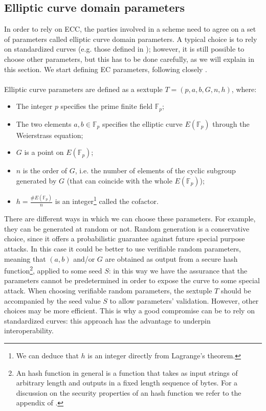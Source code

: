 \subsection{Elliptic curve domain parameters}
\label{ecparam}
In order to rely on ECC, the parties involved in a scheme need to agree on a set of parameters called elliptic curve domain parameters. A typical choice is to rely on standardized curves (e.g. those defined in \cite{RefWork:3}); however, it is still possible to choose other parameters, but this has to be done carefully, as we will explain in this section. We start defining EC parameters, following closely \cite{RefWork:2}.
\\
\\
Elliptic curve parameters are defined as a sextuple $T = (p, a, b, G, n, h)$, where:
\begin{itemize}
	\item The integer $p$ specifies the prime finite field $\mathbb{F}_p$;
	\item The two elements $a, b \in \mathbb{F}_p$ specifies the elliptic curve $E(\mathbb{F}_p)$ through the Weierstrass equation;
	\item $G$ is a point on $E(\mathbb{F}_p)$;
	\item $n$ is the order of $G$, i.e. the number of elements of the cyclic subgroup generated by $G$ (that can coincide with the whole $E(\mathbb{F}_p)$);
	\item $h = \frac{\#E(\mathbb{F}_p)}{n}$ is an integer\footnote{We can deduce that $h$ is an integer directly from Lagrange's theorem.} called the cofactor. 
\end{itemize}
There are different ways in which we can choose these parameters. For example, they can be generated at random or not. Random generation is a conservative choice, since it offers a probabilistic guarantee against future special purpose attacks. In this case it could be better to use verifiable random parameters, meaning that $(a, b)$ and/or $G$ are obtained as output from a secure hash function\footnote{An hash function in general is a function that takes as input strings of arbitrary length and outputs in a fixed length sequence of bytes. For a discussion on the security properties of an hash function we refer to the appendix of \cite{RefWork:2}.}, applied to some seed $S$: in this way we have the assurance that the parameters cannot be predetermined in order to expose the curve to some special attack. When choosing verifiable random parameters, the sextuple $T$ should be accompanied by the seed value $S$ to allow parameters' validation. However, other choices may be more efficient. This is why a good compromise can be to rely on standardized curves: this approach has the advantage to underpin interoperability.
